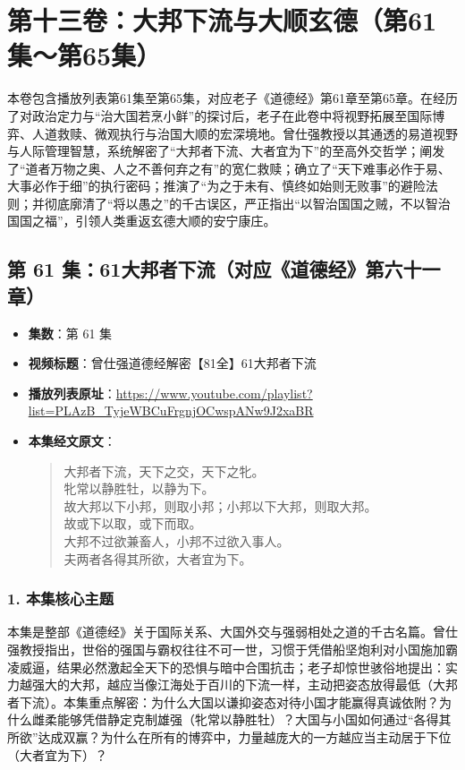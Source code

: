\section*{第十三卷：大邦下流与大顺玄德（第61集～第65集）}

本卷包含播放列表第61集至第65集，对应老子《道德经》第61章至第65章。在经历了对政治定力与“治大国若烹小鲜”的探讨后，老子在此卷中将视野拓展至国际博弈、人道救赎、微观执行与治国大顺的宏深境地。曾仕强教授以其通透的易道视野与人际管理智慧，系统解密了“大邦者下流、大者宜为下”的至高外交哲学；阐发了“道者万物之奥、人之不善何弃之有”的宽仁救赎；确立了“天下难事必作于易、大事必作于细”的执行密码；推演了“为之于未有、慎终如始则无败事”的避险法则；并彻底廓清了“将以愚之”的千古误区，严正指出“以智治国国之贼，不以智治国国之福”，引领人类重返玄德大顺的安宁康庄。

\clearpage

\subsection{第 61 集：61大邦者下流（对应《道德经》第六十一章）}
\label{sec:ep61}

\begin{itemize}
    \item \textbf{集数}：第 61 集
    \item \textbf{视频标题}：曾仕强道德经解密【81全】61大邦者下流
    \item \textbf{播放列表原址}：\url{https://www.youtube.com/playlist?list=PLAzB_TyjeWBCuFrgnjOCwspANw9J2xaBR}
    \item \textbf{本集经文原文}：
    \begin{quote}\kaishu
    大邦者下流，天下之交，天下之牝。\\
    牝常以静胜牡，以静为下。\\
    故大邦以下小邦，则取小邦；小邦以下大邦，则取大邦。\\
    故或下以取，或下而取。\\
    大邦不过欲兼畜人，小邦不过欲入事人。\\
    夫两者各得其所欲，大者宜为下。
    \end{quote}
\end{itemize}

\subsubsection{1. 本集核心主题}
本集是整部《道德经》关于国际关系、大国外交与强弱相处之道的千古名篇。曾仕强教授指出，世俗的强国与霸权往往不可一世，习惯于凭借船坚炮利对小国施加霸凌威逼，结果必然激起全天下的恐惧与暗中合围抗击；老子却惊世骇俗地提出：实力越强大的大邦，越应当像江海处于百川的下流一样，主动把姿态放得最低（大邦者下流）。本集重点解密：为什么大国以谦抑姿态对待小国才能赢得真诚依附？为什么雌柔能够凭借静定克制雄强（牝常以静胜牡）？大国与小国如何通过“各得其所欲”达成双赢？为什么在所有的博弈中，力量越庞大的一方越应当主动居于下位（大者宜为下）？

